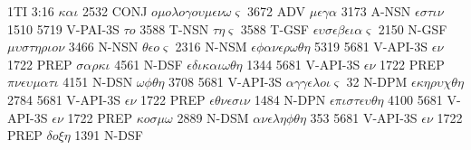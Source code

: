 \documentclass[letterpaper]{article}
\renewcommand{\baselinestretch}{4}
\begin{document}
1TI      3:16  \LARGE $\kappa\alpha\iota$ \normalsize  2532 {CONJ}  \LARGE $o\mu o\lambda o\gamma o\upsilon\mu\epsilon\nu\omega\varsigma$ \normalsize  3672 {ADV}  \LARGE $\mu\epsilon\gamma\alpha$ \normalsize  3173
{A-NSN}  \LARGE $\epsilon\sigma\tau\iota\nu$ \normalsize  1510 5719 {V-PAI-3S}  \LARGE $\tau o$ \normalsize  3588 {T-NSN}  \LARGE $\tau\eta\varsigma$ \normalsize  3588
{T-GSF}  \LARGE $\epsilon\upsilon\sigma\epsilon\beta\epsilon\iota\alpha\varsigma$ \normalsize  2150 {N-GSF}  \LARGE $\mu\upsilon\sigma\tau\eta\rho\iota o\nu$ \normalsize  3466 {N-NSN}  \LARGE $\theta\epsilon o\varsigma$ \normalsize  2316
{N-NSM}  \LARGE $\epsilon\phi\alpha\nu\epsilon\rho\omega\theta\eta$ \normalsize  5319 5681 {V-API-3S}  \LARGE $\epsilon\nu$ \normalsize  1722 {PREP}  \LARGE $\sigma\alpha\rho\kappa\iota$ \normalsize  4561
{N-DSF}  \LARGE $\epsilon\delta\iota\kappa\alpha\iota\omega\theta\eta$ \normalsize  1344 5681 {V-API-3S}  \LARGE $\epsilon\nu$ \normalsize  1722 {PREP}  \LARGE $\pi\nu\epsilon\upsilon\mu\alpha\tau\iota$ \normalsize 
4151 {N-DSN}  \LARGE $\omega\phi\theta\eta$ \normalsize  3708 5681 {V-API-3S}  \LARGE $\alpha\gamma\gamma\epsilon\lambda o\iota\varsigma$ \normalsize  32 {N-DPM}
 \LARGE $\epsilon\kappa\eta\rho\upsilon\chi\theta\eta$ \normalsize  2784 5681 {V-API-3S}  \LARGE $\epsilon\nu$ \normalsize  1722 {PREP}  \LARGE $\epsilon\theta\nu\epsilon\sigma\iota\nu$ \normalsize  1484 {N-DPN}
 \LARGE $\epsilon\pi\iota\sigma\tau\epsilon\upsilon\theta\eta$ \normalsize  4100 5681 {V-API-3S}  \LARGE $\epsilon\nu$ \normalsize  1722 {PREP}  \LARGE $\kappa o\sigma\mu\omega$ \normalsize  2889 {N-DSM}
 \LARGE $\alpha\nu\epsilon\lambda\eta\phi\theta\eta$ \normalsize  353 5681 {V-API-3S}  \LARGE $\epsilon\nu$ \normalsize  1722 {PREP}  \LARGE $\delta o\xi\eta$ \normalsize  1391 {N-DSF}
     \renewcommand{\baselinestretch}{1}
\end{document}
